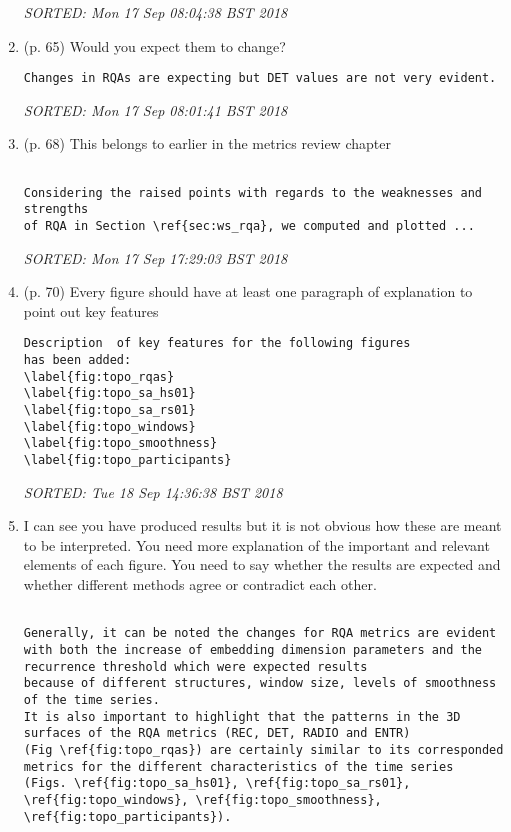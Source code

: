 \documentclass[10pt]{article}
\begin{document}
\begin{enumerate}[noitemsep,topsep=0pt]
\begin{verbatim}
\end{verbatim}
\textit{
SORTED: 
Mon 17 Sep 08:04:38 BST 2018
}
\\




\item (p. 65) Would you expect them to change?

\begin{verbatim}
Changes in RQAs are expecting but DET values are not very evident.
\end{verbatim}
\textit{
SORTED: 
Mon 17 Sep 08:01:41 BST 2018
}
\\




\item (p. 68) This belongs to earlier in the metrics review chapter

\begin{verbatim}

Considering the raised points with regards to the weaknesses and strengths 
of RQA in Section \ref{sec:ws_rqa}, we computed and plotted ...

\end{verbatim}
\textit{
SORTED: 
Mon 17 Sep 17:29:03 BST 2018
}
\\



\item (p. 70) Every figure should have at least one paragraph of explanation
	to point out key features 




\begin{verbatim}
Description  of key features for the following figures
has been added:
\label{fig:topo_rqas}
\label{fig:topo_sa_hs01}
\label{fig:topo_sa_rs01}
\label{fig:topo_windows}
\label{fig:topo_smoothness}
\label{fig:topo_participants}
\end{verbatim}
\textit{
SORTED: 
Tue 18 Sep 14:36:38 BST 2018
}
\\




\item I can see you have produced results 
	but it is not obvious how these are meant to be interpreted.
	You need more explanation of the important and relevant elements
	of each figure.
	You need to say whether the results are expected and
	whether different methods agree or contradict each other.

\begin{verbatim}

Generally, it can be noted the changes for RQA metrics are evident
with both the increase of embedding dimension parameters and the 
recurrence threshold which were expected results 
because of different structures, window size, levels of smoothness 
of the time series. 
It is also important to highlight that the patterns in the 3D 
surfaces of the RQA metrics (REC, DET, RADIO and ENTR) 
(Fig \ref{fig:topo_rqas}) are certainly similar to its corresponded
metrics for the different characteristics of the time series  
(Figs. \ref{fig:topo_sa_hs01}, \ref{fig:topo_sa_rs01}, 
\ref{fig:topo_windows}, \ref{fig:topo_smoothness}, 
\ref{fig:topo_participants}).


\end{verbatim}
\end{enumerate}
\end{document}
